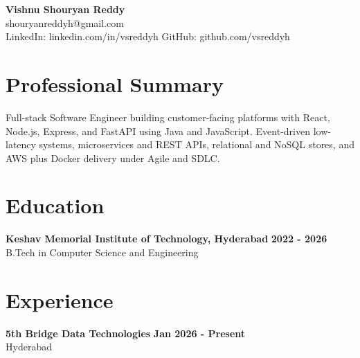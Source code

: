 \documentclass[a4paper,11pt]{article}
\newcommand{\resumeSubheading}[4]{%
  \textbf{#1} \hfill \textbf{#2} \\
{#3} \hfill {#4}
}
\begin{document}
\pagestyle{empty}
\raggedbottom
\addtolength{\textheight}{2\baselineskip}
\small

\begin{center}
  {\LARGE \textbf{Vishnu Shouryan Reddy}}\\[0.3em]
  shouryanreddyh@gmail.com \\[0.3em]
  LinkedIn: linkedin.com/in/vsreddyh \textbar{} GitHub: github.com/vsreddyh
\end{center}
\vspace{-0.8em}

\section*{Professional Summary}

Full-stack Software Engineer building customer-facing platforms with React, Node.js, Express, and FastAPI using Java and JavaScript. Event-driven low-latency systems, microservices and REST APIs, relational and NoSQL stores, and AWS plus Docker delivery under Agile and SDLC.

\section*{Education}

\resumeSubheading
{Keshav Memorial Institute of Technology, Hyderabad}{2022 - 2026}
{B.Tech in Computer Science and Engineering}{}


\section*{Experience}

\resumeSubheading
{5th Bridge Data Technologies}{Jan 2026 - Present}
{Hyderabad}{}
\end{document}
